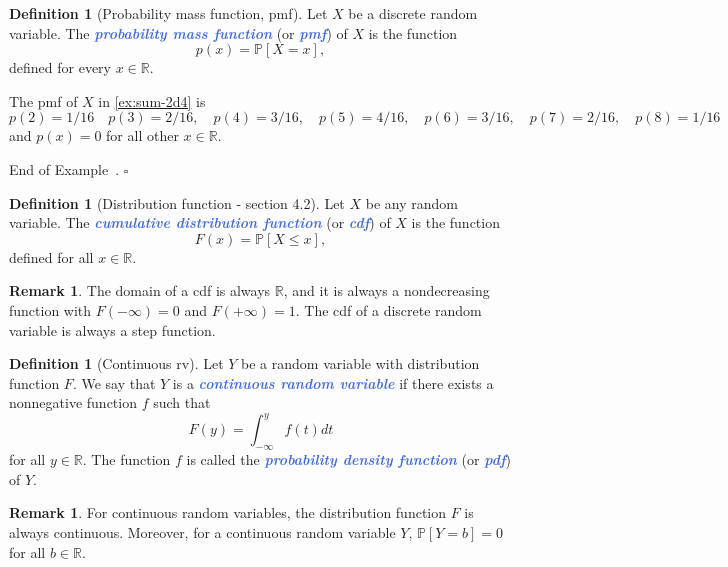\documentclass[10pt]{article}
\theoremstyle{definition}
\newtheorem{definition}[theorem]{Definition}
\newtheorem{remark}[theorem]{Remark}
\newtheorem{example}[theorem]{Example}
\renewenvironment{example}
{\begin{oldexample}}
  {\par\smallskip\hfill   End of Example~\theexample. $\square$    \par\end{oldexample}}
\newcommand{\1}[1]{\textbf{1}_{\left[#1\right]}} %
\def\R{\mathbb{R}} %
\def\P{\mathbb{P}} %
\newcommand{\demph}[1]{\textcolor{RoyalBlue}{\textbf{\slshape #1}}} %
\begin{document}
\begin{definition}[Probability mass function, pmf]
  Let $X$ be a discrete random variable. The \demph{probability mass function}
  (or \demph{pmf}) of $X$ is the function
  \begin{equation*}
    p(x) = \P\left[X=x \right],
  \end{equation*}
  defined for every $x\in \R$.
\end{definition}

\begin{example}
  The pmf of $X$ in \cref{ex:sum-2d4} is
  \begin{equation*}
    p(2) = 1/16 \quad p(3) = 2/16, \quad p(4) = 3/16, \quad p(5) = 4/16, \quad p(6) = 3/16, \quad p(7)=2/16, \quad p(8) = 1/16
  \end{equation*}
  and $p(x)=0$ for all other $x\in \R$.
\end{example}


\begin{definition}[Distribution function - section 4.2]
  Let $X$ be any random variable. The \demph{cumulative distribution function}
  (or \demph{cdf}) of $X$ is the function
  \begin{equation*}
    F(x) = \P\left[X \leq x\right],
  \end{equation*}
  defined for all $x\in \R$.
\end{definition}

\begin{remark}
  The domain of a cdf is always $\R$, and it is always a nondecreasing
  function with $F(-\infty)=0$ and $F(+\infty)=1$. The cdf of a discrete
  random variable is always a step function.
\end{remark}

\begin{definition}[Continuous rv]
  \label{def:continuous-rv}
  Let $Y$ be a random variable with distribution function $F$. We say that $Y$
  is a \demph{continuous random variable} if there exists a nonnegative
  function $f$ such that
  \begin{equation}\label{eq:1}
    F(y) = \int_{-\infty}^{y}f(t)dt
  \end{equation}
  for all $y\in \R$. The function $f$ is called the \demph{probability density
    function} (or \demph{pdf}) of $Y$.
\end{definition}


\begin{remark}
  For continuous random variables, the distribution function $F$ is always
  continuous. Moreover, for a continuous random variable $Y$,
  $\P\left[Y=b \right]=0$ for all $b\in \R$.
\end{remark}
\end{document}
